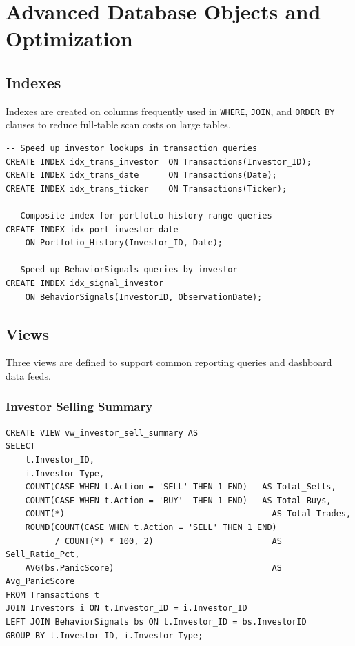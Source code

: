 \chapter{Advanced Database Objects and Optimization}
\label{chap:advanced}

\section{Indexes}

Indexes are created on columns frequently used in \texttt{WHERE}, \texttt{JOIN}, and \texttt{ORDER BY} clauses to reduce full-table scan costs on large tables.

\begin{lstlisting}[style=sqlstyle, caption={Index Definitions}]
-- Speed up investor lookups in transaction queries
CREATE INDEX idx_trans_investor  ON Transactions(Investor_ID);
CREATE INDEX idx_trans_date      ON Transactions(Date);
CREATE INDEX idx_trans_ticker    ON Transactions(Ticker);

-- Composite index for portfolio history range queries
CREATE INDEX idx_port_investor_date 
    ON Portfolio_History(Investor_ID, Date);

-- Speed up BehaviorSignals queries by investor
CREATE INDEX idx_signal_investor 
    ON BehaviorSignals(InvestorID, ObservationDate);
\end{lstlisting}


\section{Views}

Three views are defined to support common reporting queries and dashboard data feeds.

\subsection{Investor Selling Summary}

\begin{lstlisting}[style=sqlstyle, caption={View: vw\_investor\_sell\_summary}]
CREATE VIEW vw_investor_sell_summary AS
SELECT 
    t.Investor_ID,
    i.Investor_Type,
    COUNT(CASE WHEN t.Action = 'SELL' THEN 1 END)   AS Total_Sells,
    COUNT(CASE WHEN t.Action = 'BUY'  THEN 1 END)   AS Total_Buys,
    COUNT(*)                                          AS Total_Trades,
    ROUND(COUNT(CASE WHEN t.Action = 'SELL' THEN 1 END) 
          / COUNT(*) * 100, 2)                        AS Sell_Ratio_Pct,
    AVG(bs.PanicScore)                                AS Avg_PanicScore
FROM Transactions t
JOIN Investors i ON t.Investor_ID = i.Investor_ID
LEFT JOIN BehaviorSignals bs ON t.Investor_ID = bs.InvestorID
GROUP BY t.Investor_ID, i.Investor_Type;
\end{lstlisting}

